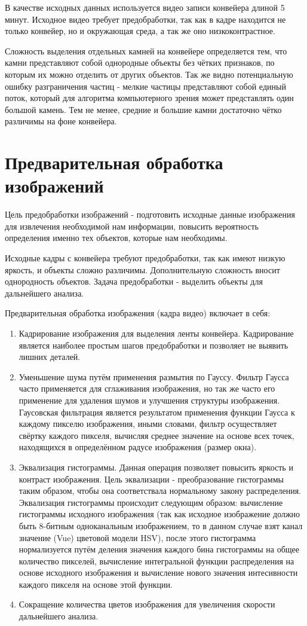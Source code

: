 \documentclass[times]{itmo-student-thesis}
\begin{document}
В качестве исходных данных используется видео записи конвейера длиной 5 минут. Исходное видео требует предобработки, так как в кадре находится не только конвейер, но и окружающая среда, а так же оно низкоконтрастное. 

Сложность выделения отдельных камней на конвейере определяется тем, что камни представляют собой однородные объекты без чётких признаков, по которым их можно отделить от других объектов. Так же видно потенциальную ошибку разграничения частиц - мелкие частицы представляют собой единый поток, который для алгоритма компьютерного зрения может представлять один большой камень. Тем не менее, средние и большие камни достаточно чётко различимы на фоне конвейера.

\section{Предварительная обработка изображений}
Цель предобработки изображений - подготовить исходные данные изображения для извлечения необходимой нам информации, повысить вероятность определения именно тех объектов, которые нам необходимы.

Исходные кадры с конвейера требуют предобработки, так как имеют низкую яркость, и объекты сложно различимы. Дополнительную сложность вносит однородность объектов. Задача предобработки - выделить объекты для дальнейшего анализа.

Предварительная обработка изображения (кадра видео) включает в себя:
\begin{enumerate}
	\item Кадрирование изображения для выделения ленты конвейера. Кадрирование является наиболее простым шагов предобработки и позволяет не выявить лишних деталей.
	\item Уменьшение шума путём применения размытия по Гауссу. Фильтр Гаусса часто применяется для сглаживания изображения, но  так же часто его применение для удаления шумов и улучшения структуры  изображения. Гаусовская фильтрация является результатом применения функции Гаусса к каждому пикселю изображения, иными словами, фильтр осуществляет свёртку каждого пикселя, вычисляя среднее значение на основе всех точек, находящихся в определённом радусе изображения (размер окна).
	\item Эквализация гистограммы. Данная операция позволяет повысить яркость и контраст изображения. Цель эквализации - преобразование гистограммы таким образом, чтобы она соответствала нормальному закону распределения. Эквализация гистограммы происходит следующим образом: вычисление гистограммы исходного изображения (так как исходное изображение должно быть 8-битным одноканальным изображением, то в данном случае взят канал значение (Vue) цветовой модели HSV), после этого гистограмма нормализуется путём деления значения каждого бина гистограммы на общее количество пикселей, вычисление интегральной функции распределения на основе исходного изображения и вычисление нового значения интесивности каждого пикселя на основе этой функции.
	\item Сокращение количества цветов изображения для увеличения скорости дальнейшего анализа.
\end{enumerate}
\end{document}
